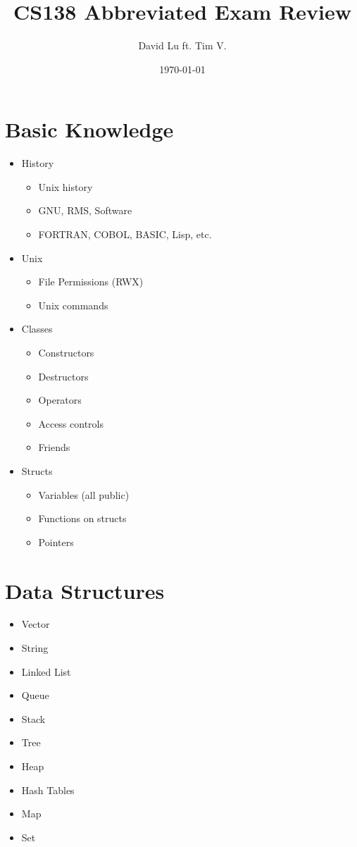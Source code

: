 \documentclass{article}
\begin{document}
\title{CS138 Abbreviated Exam Review}
\date{\today}
\author{David Lu ft. Tim V.}

\maketitle
\begin{multicols}{2}
\section{Basic Knowledge}
\begin{itemize}
	\item{History}
	\begin{itemize}
		\item{Unix history}
		\item{GNU, RMS, Software}
		\item{FORTRAN, COBOL, BASIC, Lisp, etc.}
	\end{itemize}
	\item{Unix}
	\begin{itemize}
		\item{File Permissions (RWX)}
		\item{Unix commands}
	\end{itemize}
	\item{Classes}
	\begin{itemize}
		\item{Constructors}
		\item{Destructors}
		\item{Operators}
		\item{Access controls}
		\item{Friends}
	\end{itemize}
	\item{Structs}
	\begin{itemize}
		\item{Variables (all public)}
		\item{Functions on structs}
		\item{Pointers}
	\end{itemize}
\end{itemize}

\section{Data Structures}

\begin{itemize}
	\item{Vector}
	\item{String}
	\item{Linked List}
	\item{Queue}
	\item{Stack}
	\item{Tree}
	\item{Heap}
	\item{Hash Tables}
	\item{Map}
	\item{Set}
\end{itemize}


\end{multicols}
\end{document}
